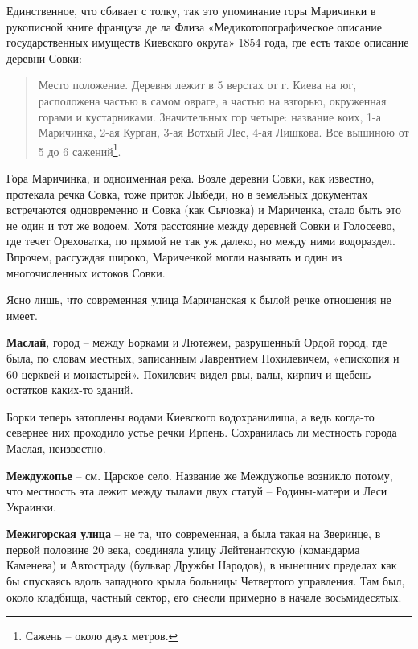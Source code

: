 Единственное, что сбивает с толку, так это упоминание горы Маричинки в рукописной книге француза де ла Флиза «Медикотопографическое описание государственных имуществ Киевского округа» 1854 года, где есть такое описание деревни Совки:

\begin{quotation}
Место положение. Деревня лежит в 5 верстах от г. Киева на юг, расположена частью в самом овраге, а частью на взгорью, окруженная горами и кустарниками. Значительных гор четыре: название коих, 1-а Маричинка, 2-ая Курган, 3-ая Вотхый Лес, 4-ая Лишкова. Все вышиною от 5 до 6 сажений\footnote{Сажень – около двух метров.}.
\end{quotation}

Гора Маричинка, и одноименная река. Возле деревни Совки, как известно, протекала речка Совка, тоже приток Лыбеди, но в земельных документах встречаются одновременно и Совка (как Сычовка) и Мариченка, стало быть это не один и тот же водоем. Хотя расстояние между деревней Совки и Голосеево, где течет Ореховатка, по прямой не так уж далеко, но между ними водораздел. Впрочем, рассуждая широко, Мариченкой могли называть и один из многочисленных истоков Совки. 

Ясно лишь, что современная улица Маричанская к былой речке отношения не имеет.\\ 

\medskip

\textbf{Маслай}, город – между Борками и Лютежем, разрушенный Ордой город, где была, по словам местных, записанным Лаврентием Похилевичем, «епископия и 60 церквей и монастырей». Похилевич видел рвы, валы, кирпич и щебень остатков каких-то зданий.

Борки теперь затоплены водами Киевского водохранилища, а ведь когда-то севернее них проходило устье речки Ирпень. Сохранилась ли местность города Маслая, неизвестно.\\

\medskip

\textbf{Междужопье} – см. Царское село. Название же Междужопье возникло потому, что местность эта лежит между тылами двух статуй – Родины-матери и Леси Украинки.\\

\medskip

\textbf{Межигорская улица} – не та, что современная, а была такая на Зверинце, в первой половине 20 века, соединяла улицу Лейтенантскую (командарма Каменева) и Автостраду (бульвар Дружбы Народов), в нынешних пределах как бы спускаясь вдоль западного крыла больницы Четвертого управления. Там был, около кладбища, частный сектор, его снесли примерно в начале восьмидесятых.\\


